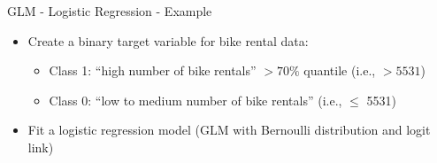 \documentclass[11pt,compress,t,notes=noshow, aspectratio=169, xcolor=table]{beamer}
\begin{document}
\begin{frame}{GLM - Logistic Regression - Example}

\begin{itemize}
    \item Create a binary target variable for bike rental data:
    \begin{itemize}
        \item Class 1: ``high number of bike rentals'' $>70\%$ quantile (i.e.,  $> 5531$)
        \item Class 0: ``low to medium number of bike rentals'' (i.e.,  $\leq$ 5531)
    \end{itemize}
    \item Fit a logistic regression model (GLM with Bernoulli distribution and logit link)
\end{itemize}


\end{frame}
\end{document}
